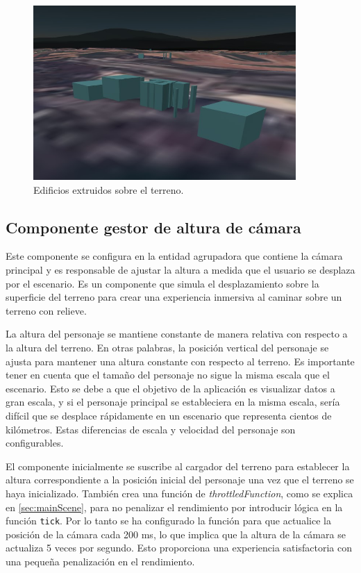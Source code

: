 \documentclass[a4paper, 11pt]{book}
\begin{document}
\begin{figure}[h]
  \centering
  \includegraphics[width=10cm, keepaspectratio]{img/buildings.jpg}
  \caption{Edificios extruidos sobre el terreno.}
  \label{fig:buildings}
\end{figure}
\subsection{Componente gestor de altura de cámara}
\label{subsec:cameraHeight}
Este componente se configura en la entidad agrupadora que contiene la cámara principal y es responsable de ajustar la altura a medida que el usuario se desplaza por el escenario. Es un componente que simula el desplazamiento sobre la superficie del terreno para crear una experiencia inmersiva al caminar sobre un terreno con relieve.

La altura del personaje se mantiene constante de manera relativa con respecto a la altura del terreno. En otras palabras, la posición vertical del personaje se ajusta para mantener una altura constante con respecto al terreno.
Es importante tener en cuenta que el tamaño del personaje no sigue la misma escala que el escenario. Esto se debe a que el objetivo de la aplicación es visualizar datos a gran escala, y si el personaje principal se estableciera en la misma escala, sería difícil que se desplace rápidamente en un escenario que representa cientos de kilómetros. Estas diferencias de escala y velocidad del personaje son configurables.

El componente inicialmente se suscribe al cargador del terreno para establecer la altura correspondiente a la posición inicial del personaje una vez que el terreno se haya inicializado. También crea una función de \emph{throttledFunction}, como se explica en \ref{sec:mainScene}, para no penalizar el rendimiento por introducir lógica en la función \texttt{tick}. Por lo tanto se ha configurado la función para que actualice la posición de la cámara cada 200 ms, lo que implica que la altura de la cámara se actualiza 5 veces por segundo. Esto proporciona una experiencia satisfactoria con una pequeña penalización en el rendimiento.
\end{document}
